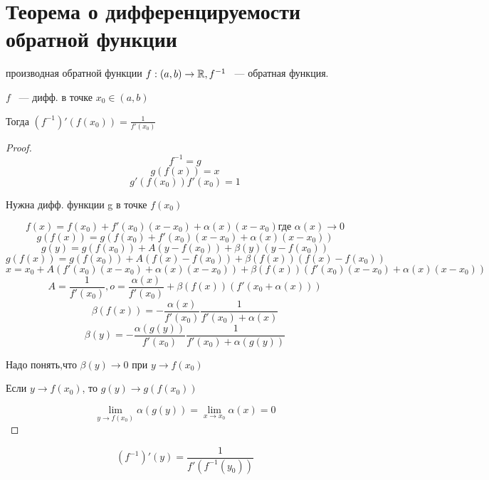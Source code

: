 ﻿\section{Теорема о дифференцируемости обратной функции}


\begin{theorem}{производная обратной функции}
$f: (a, b) \to \mathbb{R},f^{-1}$ ~--- обратная функция.

$f$ ~--- дифф. в точке $x_0 \in (a, b)$

Тогда $(f^{-1})'(f(x_0)) = \frac{1}{f'(x_0)}$

\end{theorem}

\begin{proof}

$$f^{-1} = g$$
$$g(f(x)) = x$$
$$g'(f(x_0))f'(x_0) = 1$$

Нужна дифф. функции g в точке $f(x_0)$

$$f(x) = f(x_0) + f'(x_0)(x - x_0) + \alpha (x)(x - x_0) \text{где $\alpha(x) \to 0$}$$
$$g(f(x)) = g(f(x_0) + f'(x_0)(x - x_0) + \alpha (x)(x - x_0))$$
$$g(y) = g(f(x_0)) + A(y - f(x_0)) + \beta(y)(y - f(x_0))$$
$$g(f(x)) = g(f(x_0)) + A(f(x) - f(x_0)) + \beta(f(x))(f(x) - f(x_0))$$
$$x = x_0 + A(f'(x_0)(x - x_0) + \alpha(x)(x - x_0)) + \beta(f(x))(f'(x_0)(x - x_0) + \alpha(x)(x - x_0))$$
$$A = \frac{1}{f'(x_0)}, o = \frac{\alpha(x)}{f'(x_0)} + \beta(f(x))(f'(x_0 + \alpha(x)))$$
$$\beta(f(x)) = -\frac{\alpha(x)}{f'(x_0)}\frac{1}{f'(x_0) + \alpha(x)}$$
$$\beta(y) = -\frac{\alpha(g(y))}{f'(x_0)}\frac{1}{f'(x_0) + \alpha(g(y))}$$

Надо понять,что $\beta(y) \to 0$ при $y \to f(x_0)$

Если $y \to f(x_0)$, то $g(y) \to g(f(x_0))$

$$\lim_{y \to f(x_0)}\alpha(g(y)) = \lim_{x \to x_0}\alpha(x) = 0$$
\end{proof}

\begin{conseq}
$$(f^{-1})'(y) = \frac{1}{f'(f^{-1}(y_0))}$$

\end{conseq}